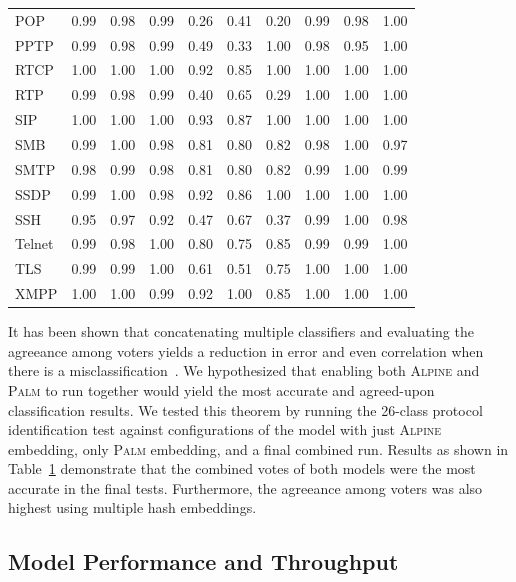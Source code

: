 \begin{table}
\begin{tabular}{| p{2cm} | p{0.6cm} p{0.6cm} p{0.6cm} || p{0.6cm} p{0.6cm} p{0.6cm} || p{0.6cm} p{0.6cm} p{0.6cm}|}
 POP & 0.99 & 0.98 & 0.99 & 0.26 & 0.41 & 0.20 & 0.99 & 0.98 & 1.00 \\
 PPTP & 0.99 & 0.98 & 0.99 & 0.49 & 0.33 & 1.00 & 0.98 & 0.95 & 1.00 \\
 RTCP & 1.00 & 1.00 & 1.00 & 0.92 & 0.85 & 1.00 & 1.00 & 1.00 & 1.00 \\
 RTP & 0.99 & 0.98 & 0.99 & 0.40 & 0.65 & 0.29 & 1.00 & 1.00 & 1.00 \\
 SIP & 1.00 & 1.00 & 1.00 & 0.93 & 0.87 & 1.00 & 1.00 & 1.00 & 1.00 \\
 SMB & 0.99 & 1.00 & 0.98 & 0.81 & 0.80 & 0.82 & 0.98 & 1.00 & 0.97 \\
 SMTP & 0.98 & 0.99 & 0.98 & 0.81 & 0.80 & 0.82 & 0.99 & 1.00 & 0.99 \\
 SSDP & 0.99 & 1.00 & 0.98 & 0.92 & 0.86 & 1.00 & 1.00 & 1.00 & 1.00 \\
 SSH & 0.95 & 0.97 & 0.92 & 0.47 & 0.67 & 0.37 & 0.99 & 1.00 & 0.98 \\
 Telnet & 0.99 & 0.98 & 1.00 & 0.80 & 0.75 & 0.85 & 0.99 & 0.99 & 1.00 \\
 TLS & 0.99 & 0.99 & 1.00 & 0.61 & 0.51 & 0.75 & 1.00 & 1.00 & 1.00 \\
 XMPP & 1.00 & 1.00 & 0.99 & 0.92 & 1.00 & 0.85 & 1.00 & 1.00 & 1.00 \\
 \hline
\end{tabular}
\label{table:embeddingresults}
\end{table}

It has been shown that concatenating multiple classifiers and evaluating the agreeance among voters yields a reduction in error and even correlation when there is a misclassification~\cite{tumerensemble}. We hypothesized that enabling both \textsc{Alpine} and \textsc{Palm} to run together would yield the most accurate and agreed-upon classification results. We tested this theorem by running the 26-class protocol identification test against configurations of the model with just \textsc{Alpine} embedding, only \textsc{Palm} embedding, and a final combined run. Results as shown in Table~\ref{table:embeddingresults} demonstrate that the combined votes of both models were the most accurate in the final tests. Furthermore, the agreeance among voters was also highest using multiple hash embeddings.

\subsection{Model Performance and Throughput}

